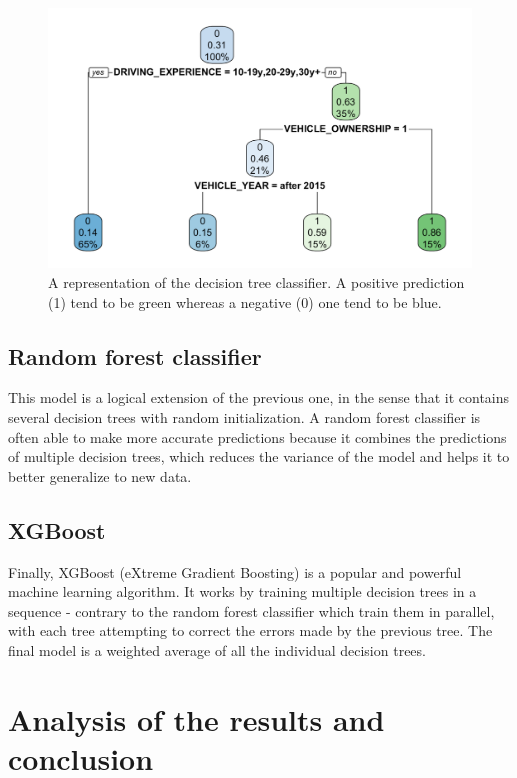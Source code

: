 \documentclass[a4paper,11pt, titlepage]{article}
\begin{document}
\begin{figure}[h!]
    \centering
    \includegraphics[width=\textwidth]{decision-tree-fit.png}
    \caption{A representation of the decision tree classifier. A positive prediction (1) tend to be green whereas a negative (0) one tend to be blue.}
    \label{fig:decision-tree}
\end{figure}

\subsection{Random forest classifier}

This model is a logical extension of the previous one, in the sense that it contains several decision trees with random initialization. A random forest classifier is often able to make more accurate predictions because it combines the predictions of multiple decision trees, which reduces the variance of the model and helps it to better generalize to new data. 

\subsection{XGBoost}

Finally, XGBoost (eXtreme Gradient Boosting) is a popular and powerful machine learning algorithm. It works by training multiple decision trees in a sequence - contrary to the random forest classifier which train them in parallel, with each tree attempting to correct the errors made by the previous tree. The final model is a weighted average of all the individual decision trees.



\section{Analysis of the results and conclusion} \label{results}
\end{document}
